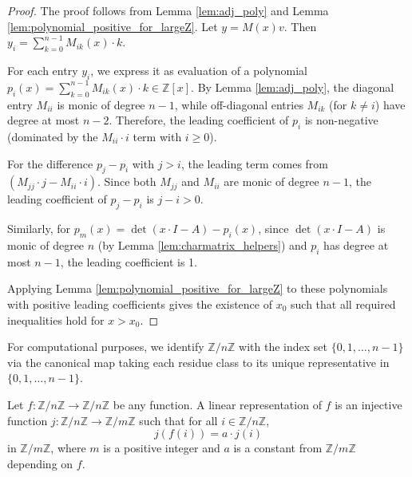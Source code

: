 \begin{proof}
The proof follows from Lemma \ref{lem:adj_poly} and Lemma \ref{lem:polynomial_positive_for_largeZ}.
Let $y = M(x)v$. Then $y_i = \sum_{k=0}^{n-1} M_{ik}(x) \cdot k$.

For each entry $y_i$, we express it as evaluation of a polynomial $p_i(x) = \sum_{k=0}^{n-1} M_{ik}(x) \cdot k \in \mathbb{Z}[x]$.
By Lemma \ref{lem:adj_poly}, the diagonal entry $M_{ii}$ is monic of degree $n-1$, while off-diagonal entries $M_{ik}$ (for $k \neq i$) have degree at most $n-2$.
Therefore, the leading coefficient of $p_i$ is non-negative (dominated by the $M_{ii} \cdot i$ term with $i \geq 0$).

For the difference $p_j - p_i$ with $j > i$, the leading term comes from $(M_{jj} \cdot j - M_{ii} \cdot i)$. Since both $M_{jj}$ and $M_{ii}$ are monic of degree $n-1$, the leading coefficient of $p_j - p_i$ is $j - i > 0$.

Similarly, for $p_m(x) = \det(x\cdot I - A) - p_i(x)$, since $\det(x\cdot I - A)$ is monic of degree $n$ (by Lemma \ref{lem:charmatrix_helpers}) and $p_i$ has degree at most $n-1$, the leading coefficient is 1.

Applying Lemma \ref{lem:polynomial_positive_for_largeZ} to these polynomials with positive leading coefficients gives the existence of $x_0$ such that all required inequalities hold for $x > x_0$.
\end{proof}

\begin{definition}
\label{def:zmodToFin}
\leanok
For computational purposes, we identify $\mathbb{Z}/n\mathbb{Z}$ with the index set $\{0,1,\ldots,n-1\}$ via the canonical map 
taking each residue class to its unique representative in $\{0,1,\ldots,n-1\}$.
\end{definition}

\begin{definition}
\label{def:linear_representation}
\leanok
Let $f: \mathbb{Z}/n\mathbb{Z} \to \mathbb{Z}/n\mathbb{Z}$ be any function. A linear representation of $f$ is an injective function $j: \mathbb{Z}/n\mathbb{Z} \to \mathbb{Z}/m\mathbb{Z}$ 
such that for all $i\in \mathbb{Z}/n\mathbb{Z}$,
$$j(f(i)) = a \cdot j(i)$$
in $\mathbb{Z}/m\mathbb{Z}$, where $m$ is a positive integer and $a$ is a constant from $\mathbb{Z}/m\mathbb{Z}$ depending on $f$.
\end{definition}


